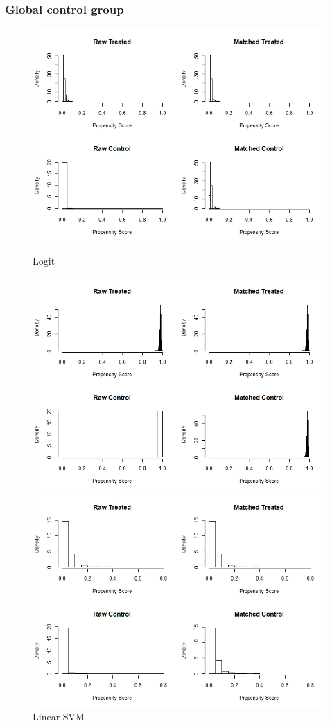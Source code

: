 \documentclass[11pt,a4paper,oneside]{article}
\begin{document}
\subsubsection{Global control group}
\begin{figure}[!t]
  \includegraphics[width=\linewidth]{Figures/global_logit_hist.jpeg}
  \caption{Logit}\label{fig:histogram_global1}
\endminipage
{}
  \includegraphics[width=\linewidth]{Figures/global_svm_hist.jpeg}
  \caption{Linear SVM}\label{fig:histogram_global2}
\endminipage\hfill
{}%
  \includegraphics[width=\linewidth]{Figures/global_xgb_hist.jpeg}

\end{figure}
\end{document}
